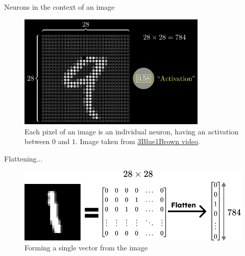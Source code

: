 \documentclass{beamer}
\begin{document}
    \begin{frame}{Neurons in the context of an image}
        \begin{figure}
        \centering
            \includegraphics[width=0.8\textwidth]{images/presentation/image_activations.png}
            \caption{Each pixel of an image is an individual neuron, having an activation between $0$ and $1$. Image taken from \href{https://www.youtube.com/watch?v=aircAruvnKk&list=PLZHQObOWTQDNU6R1_67000Dx_ZCJB-3pi}{3Blue1Brown video}.}
        \end{figure}
    \end{frame}

    \begin{frame}{Flattening...}
        \begin{figure}
        \centering
            \includegraphics[width=\textwidth]{images/presentation/flatten.png}
            \caption{Forming a single vector from the image}
        \end{figure}
    \end{frame}
\end{document}
